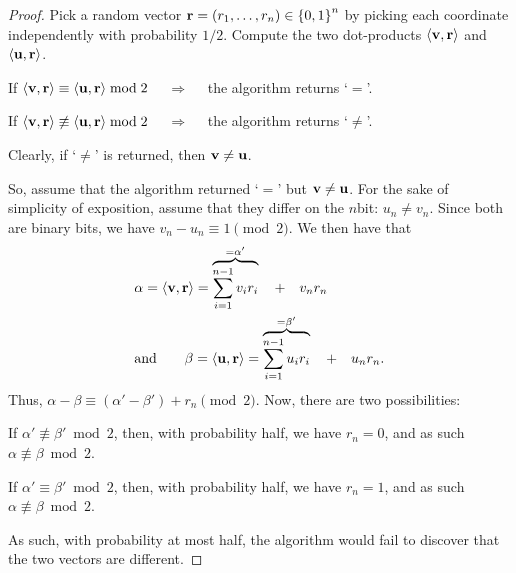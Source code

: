 \begin{proof}
    Pick a random vector
    $\vecRand = \pth[]{r_1, \ldots, r_n} \in \brc{ 0,1}^n$ by picking
    each coordinate independently with probability $1/2$. Compute the
    two dot-products $\left\langle {{\mathbf{v}},{\mathbf{r}}} \right\rangle$ and
    $\left\langle {{\mathbf{u}},{\mathbf{r}}} \right\rangle$.
    \begin{compactenumA}
        \smallskip%
        \medskip
        \item If $\left\langle {{\mathbf{v}},{\mathbf{r}}} \right\rangle \equiv
        {\left\langle {{\mathbf{u}},{\mathbf{r}}} \right\rangle} \bmod 2$ $\quad\Rightarrow\quad$ the
        algorithm returns `$\boldsymbol =$'.

        \smallskip%
        \item If $\left\langle {{\mathbf{v}},{\mathbf{r}}} \right\rangle \not\equiv
        {\left\langle {{\mathbf{u}},{\mathbf{r}}} \right\rangle} \bmod 2$ $\quad\Rightarrow\quad$ the
        algorithm returns `$\boldsymbol \ne$'.
    \end{compactenumA}
    \smallskip%
    Clearly, if `$\boldsymbol \ne$' is returned, then
    $\mathbf{v} \neq \mathbf{u}$.

    So, assume that the algorithm returned `$\boldsymbol =$' but
    $\mathbf{v} \neq \mathbf{u}$. For the sake of simplicity of exposition,
    assume that they differ on the $n$\th bit: $u_n \neq v_n$.
    Since both are binary bits, we have $v_n - u_n \equiv 1 \pmod 2$.
    We then have that
    \begin{align*}
        &\alpha = \DotProd{\vecA}{\vecRand} =
        \overbrace{\sum_{i=1}^{n-1} v_i r_i}^{=\alpha'} \quad+\quad
        v_n r_n%
        \\&
        \text{and\qquad }%
        \beta = \DotProd{\vecB}{\vecRand} =
        \overbrace{\sum_{i=1}^{n-1} u_i r_i}^{=\beta'} \quad+\quad u_n
        r_n.
    \end{align*}
    Thus, $\alpha - \beta \equiv (\alpha' - \beta') + r_n \pmod 2$.
    Now, there are two possibilities:
    \begin{compactenumA}
        \smallskip%
        \item If $\alpha' \nequiv \beta' \bmod 2$, then, with
        probability half, we have $r_n = 0$, and as such $\alpha
        \nequiv \beta \bmod 2$.
        \smallskip%
        \item If $\alpha' \equiv \beta' \bmod 2$, then, with
        probability half, we have $r_n = 1$, and as such $\alpha
        \nequiv \beta \bmod 2$.
    \end{compactenumA}
    \smallskip%
    As such, with probability at most half, the algorithm would fail
    to discover that the two vectors are different.
\end{proof}

